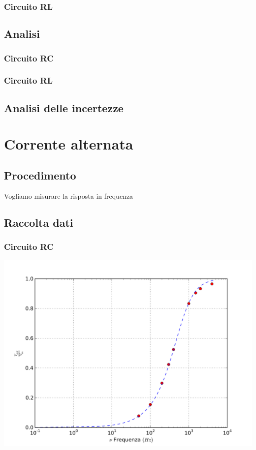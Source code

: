 \subsubsection{Circuito RL}

\subsection{Analisi}

\subsubsection{Circuito RC}
\subsubsection{Circuito RL}
\subsection{Analisi delle incertezze}


\section{Corrente alternata}
\subsection{Procedimento}


Vogliamo misurare la risposta in frequenza 
\subsection{Raccolta dati}

\subsubsection{Circuito RC}

\begin{center}
 \includegraphics[scale=0.70]{grafici/C3/ddpcond.png}
\end{center}

